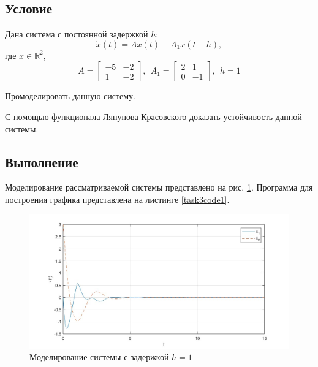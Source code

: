 \documentclass[a4paper, 12pt]{article}
\begin{document}
    \subsection{Условие}
    Дана система с постоянной задержкой $h$:
    $$\dot{x}(t)=Ax(t)+A_1x(t-h),$$ где $x\in\mathbb{R}^2$,
    $$
    A=
    \begin{bmatrix}
        -5 & -2\\
        1 & -2
    \end{bmatrix},\ \
    A_1=
    \begin{bmatrix}
        2 & 1\\
        0 & -1
    \end{bmatrix},\ \
    h=1
    $$
    \begin{compactitem}
        \item Промоделировать данную систему.
        \item С помощью функционала Ляпунова-Красовского доказать
        устойчивость данной системы.
    \end{compactitem}


    \subsection{Выполнение}
    Моделирование рассматриваемой системы представлено на рис. \ref{fig:task3}.
    Программа для построения графика представлена на листинге \ref{task3code1}.
    \begin{figure}[H]
        \centering
        \includegraphics[scale=0.4]{task3.jpg}
        \captionsetup{skip=0pt}
        \caption{Моделирование системы с задержкой $h=1$}
        \label{fig:task3}
    \end{figure}
\end{document}
